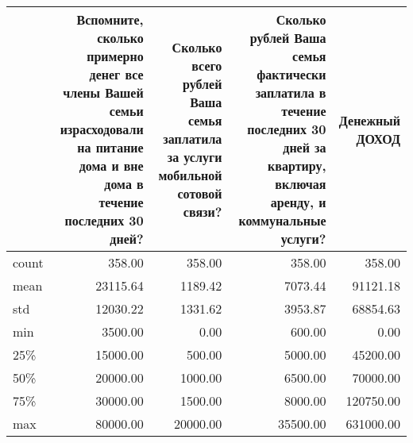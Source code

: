 \begin{tabular}{lrrrr}
\toprule
{} &  Вспомните, сколько примерно денег все члены Вашей семьи израсходовали на питание дома и вне дома в течение последних 30 дней? &  Сколько всего рублей Ваша семья заплатила за услуги мобильной сотовой связи?  &  Сколько рублей Ваша семья фактически заплатила в течение последних 30 дней за квартиру, включая аренду, и коммунальные услуги? &  Денежный ДОХОД \\
\midrule
count &                                             358.00 &                                             358.00 &                                             358.00 &          358.00 \\
mean  &                                           23115.64 &                                            1189.42 &                                            7073.44 &        91121.18 \\
std   &                                           12030.22 &                                            1331.62 &                                            3953.87 &        68854.63 \\
min   &                                            3500.00 &                                               0.00 &                                             600.00 &            0.00 \\
25\%   &                                           15000.00 &                                             500.00 &                                            5000.00 &        45200.00 \\
50\%   &                                           20000.00 &                                            1000.00 &                                            6500.00 &        70000.00 \\
75\%   &                                           30000.00 &                                            1500.00 &                                            8000.00 &       120750.00 \\
max   &                                           80000.00 &                                           20000.00 &                                           35500.00 &       631000.00 \\
\bottomrule
\end{tabular}
